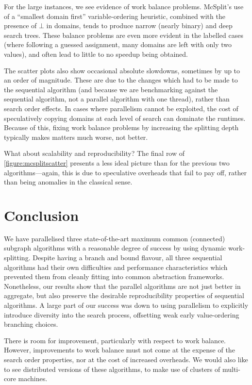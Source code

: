 \documentclass{llncs}
\begin{document}
For the large instances, we see evidence of work balance problems. McSplit's use of a ``smallest
domain first'' variable-ordering heuristic, combined with the presence of $\bot$ in domains, tends
to produce narrow (nearly binary) and deep search trees. These balance problems are even more
evident in the labelled cases (where following a guessed assignment, many domains are left with only
two values), and often lead to little to no speedup being obtained.

The scatter plots also show occasional absolute slowdowns, sometimes by up to an order of magnitude.
These are due to the changes which had to be made to the sequential algorithm (and because we are
benchmarking against the sequential algorithm, not a parallel algorithm with one thread), rather
than search order effects. In cases where parallelism cannot be exploited, the cost of speculatively
copying domains at each level of search can dominate the runtimes. Because of this, fixing work
balance problems by increasing the splitting depth typically makes matters much worse, not better.

What about scalability and reproducibility? The final row of \cref{figure:mcsplitscatter} presents a
less ideal picture than for the previous two algorithms---again, this is due to speculative
overheads that fail to pay off, rather than being anomalies in the classical sense.

\section{Conclusion}

We have parallelised three state-of-the-art maximum common (connected) subgraph algorithms with a
reasonable degree of success by using dynamic work-splitting. Despite having a branch and bound
flavour, all three sequential algorithms had their own difficulties and performance characteristics
which prevented them from cleanly fitting into common abstraction frameworks. Nonetheless, our
results show that the parallel algorithms are not just better in aggregate, but also preserve the
desirable reproducibility properties of sequential algorithms. A large part of our success was down
to using parallelism to explicitly introduce diversity into the search process, offsetting weak
early value-ordering branching choices.

There is room for improvement, particularly with respect to work balance. However, improvements to
work balance must not come at the expense of the search order properties, nor at the cost of
increased overheads. We would also like to see distributed versions of these algorithms, to make use
of clusters of multi-core machines.
\end{document}

